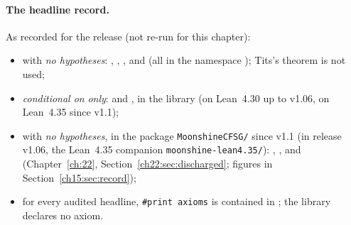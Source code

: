 \paragraph{The headline record.} As recorded for the release (not
re-run for this chapter):
\begin{itemize}
\item with \emph{no hypotheses}: ,
  , ,  and
   (all in the namespace ); Tits's theorem is
  not used;
\item \emph{conditional on}  \emph{only}:  and ,
  in the library  (on Lean~4.30 up to v1.06, on Lean~4.35 since v1.1);
\item with \emph{no hypotheses}, in the package \texttt{MoonshineCFSG/} since v1.1 (in release v1.06, the Lean~4.35
  companion \texttt{moonshine-lean4.35/}):
  , ,  and
   (Chapter~\ref{ch:22}, Section~\ref{ch22:sec:discharged}; figures in
  Section~\ref{ch15:sec:record});
\item for every audited headline, \texttt{\#print axioms} is contained in ;
  the library declares no axiom.
\end{itemize}

